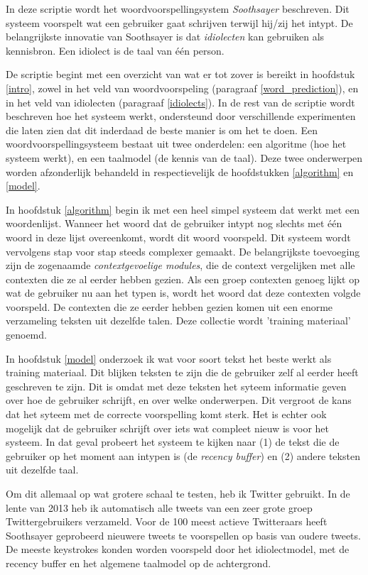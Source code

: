 \documentclass[12pt]{article}
\begin{document}
In deze scriptie wordt het woordvoorspellingsystem \emph{Soothsayer} beschreven. Dit systeem voorspelt wat een gebruiker gaat schrijven terwijl hij/zij het intypt. De belangrijkste innovatie van Soothsayer is dat \emph{idiolecten} kan gebruiken als kennisbron. Een idiolect is de taal van \'e\'en person.

De scriptie begint met een overzicht van wat er tot zover is bereikt in hoofdstuk \ref{intro}, zowel in het veld van woordvoorspeling (paragraaf \ref{word_prediction}), en in het veld van idiolecten (paragraaf \ref{idiolects}). In de rest van de scriptie wordt beschreven hoe het systeem werkt, ondersteund door verschillende experimenten die laten zien dat dit inderdaad de beste manier is om het te doen. Een woordvoorspellingsysteem bestaat uit twee onderdelen: een algoritme (hoe het systeem werkt), en een taalmodel (de kennis van de taal). Deze twee onderwerpen worden afzonderlijk behandeld in respectievelijk de hoofdstukken \ref{algorithm} en \ref{model}.

In hoofdstuk \ref{algorithm} begin ik met een heel simpel systeem dat werkt met een woordenlijst. Wanneer het woord dat de gebruiker intypt nog slechts met \'e\'en woord in deze lijst overeenkomt, wordt dit woord voorspeld. Dit systeem wordt vervolgens stap voor stap steeds complexer gemaakt. De belangrijkste toevoeging zijn de zogenaamde \emph{contextgevoelige modules}, die de context vergelijken met alle contexten die ze al eerder hebben gezien. Als een groep contexten genoeg lijkt op wat de gebruiker nu aan het typen is, wordt het woord dat deze contexten volgde voorspeld. De contexten die ze eerder hebben gezien komen uit een enorme verzameling teksten uit dezelfde talen. Deze collectie wordt 'training materiaal' genoemd.

In hoofdstuk \ref{model} onderzoek ik wat voor soort tekst het beste werkt als training materiaal. Dit blijken teksten te zijn die de gebruiker zelf al eerder heeft geschreven te zijn. Dit is omdat met deze teksten het syteem informatie geven over hoe de gebruiker schrijft, en over welke onderwerpen. Dit vergroot de kans dat het syteem met de correcte voorspelling komt sterk. Het is echter ook mogelijk dat de gebruiker schrijft over iets wat compleet nieuw is voor het systeem. In dat geval probeert het systeem te kijken naar (1) de tekst die de gebruiker op het moment aan intypen is (de \emph{recency buffer}) en (2) andere teksten uit dezelfde taal.

Om dit allemaal op wat grotere schaal te testen, heb ik Twitter gebruikt. In de lente van 2013 heb ik automatisch alle tweets van een zeer grote groep Twittergebruikers verzameld. Voor de 100 meest actieve Twitteraars heeft Soothsayer geprobeerd nieuwere tweets te voorspellen op basis van oudere tweets. De meeste keystrokes konden worden voorspeld door het idiolectmodel, met de recency buffer en het algemene taalmodel op de achtergrond.
\end{document}
